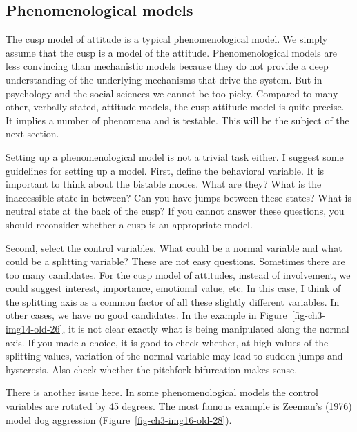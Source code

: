 \documentclass[
  a4paper,
  DIV=11,
  numbers=noendperiod,
  oneside]{scrreprt}
\begin{document}
\hypertarget{sec-Phenomenological-models}{%
\subsection{Phenomenological models}\label{sec-Phenomenological-models}}

The cusp model of attitude is a typical phenomenological model. We
simply assume that the cusp is a model of the attitude. Phenomenological
models are less convincing than mechanistic models because they do not
provide a deep understanding of the underlying mechanisms that drive the
system. But in psychology and the social sciences we cannot be too
picky. Compared to many other, verbally stated, attitude models, the
cusp attitude model is quite precise. It implies a number of phenomena
and is testable. This will be the subject of the next section.

Setting up a phenomenological model is not a trivial task either. I
suggest some guidelines for setting up a model. First, define the
behavioral variable. It is important to think about the bistable modes.
What are they? What is the inaccessible state in-between? Can you have
jumps between these states? What is neutral state at the back of the
cusp? If you cannot answer these questions, you should reconsider
whether a cusp is an appropriate model.

Second, select the control variables. What could be a normal variable
and what could be a splitting variable? These are not easy questions.
Sometimes there are too many candidates. For the cusp model of
attitudes, instead of involvement, we could suggest interest,
importance, emotional value, etc. In this case, I think of the splitting
axis as a common factor of all these slightly different variables. In
other cases, we have no good candidates. In the example in
Figure~\ref{fig-ch3-img14-old-26}, it is not clear exactly what is being
manipulated along the normal axis. If you made a choice, it is good to
check whether, at high values of the splitting values, variation of the
normal variable may lead to sudden jumps and hysteresis. Also check
whether the pitchfork bifurcation makes sense.

There is another issue here. In some phenomenological models the control
variables are rotated by 45 degrees. The most famous example is Zeeman's
(1976) model dog aggression (Figure~\ref{fig-ch3-img16-old-28}).
\end{document}
